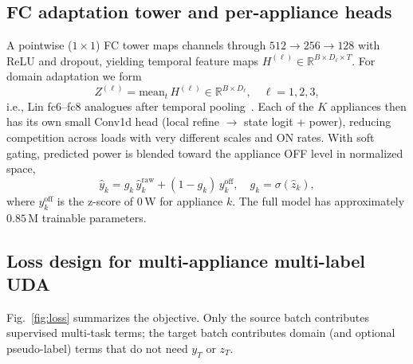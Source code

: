 \documentclass[journal]{IEEEtran}
\begin{document}
\subsection{FC adaptation tower and per-appliance heads}
A pointwise ($1{\times}1$) FC tower maps channels through $512\rightarrow 256\rightarrow 128$ with ReLU and dropout, yielding temporal feature maps $H^{(\ell)}\in\mathbb{R}^{B\times D_\ell\times T}$.
For domain adaptation we form
\begin{equation}
Z^{(\ell)}=\mathrm{mean}_{t}\,H^{(\ell)}\in\mathbb{R}^{B\times D_\ell},
\quad \ell=1,2,3,
\label{eq:pool}
\end{equation}
i.e., Lin fc6--fc8 analogues after temporal pooling~\cite{lin2022dda}.
Each of the $K$ appliances then has its own small Conv1d head (local refine $\rightarrow$ state logit + power), reducing competition across loads with very different scales and ON rates.
With soft gating, predicted power is blended toward the appliance OFF level in normalized space,
\begin{equation}
\hat{y}_{k}=g_{k}\,\hat{y}^{\mathrm{raw}}_{k}+(1-g_{k})\,y_{k}^{\mathrm{off}},
\quad
g_{k}=\sigma(\hat{z}_{k}),
\label{eq:gate}
\end{equation}
where $y_{k}^{\mathrm{off}}$ is the z-score of $0$\,W for appliance $k$.
The full model has approximately $0.85$\,M trainable parameters.

\subsection{Loss design for multi-appliance multi-label UDA}
\label{sec:loss}
Fig.~\ref{fig:loss} summarizes the objective.
Only the source batch contributes supervised multi-task terms; the target batch contributes domain (and optional pseudo-label) terms that do not need $y_T$ or $z_T$.
\end{document}
